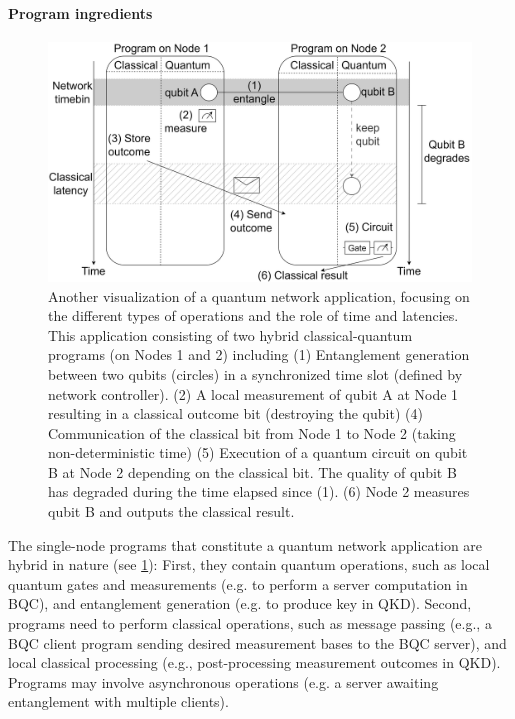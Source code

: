 \paragraph{Program ingredients}

\begin{figure}%
    \centering
    \includegraphics[scale=0.35]{figures/qoala/program_illustration.png}
    \caption{Another visualization of a quantum network application, focusing on the different types of operations and the role of time and latencies.
    This application consisting of two hybrid classical-quantum programs (on Nodes 1 and 2) including
        (1) Entanglement generation between two qubits (circles) in a synchronized time slot (defined by  network controller).
        (2) A local measurement of qubit A at Node 1 resulting in a classical outcome bit (destroying the qubit)
        (4) Communication of the classical bit from Node 1 to Node 2 (taking non-deterministic time)
        (5) Execution of a quantum circuit on qubit B at Node 2 depending on the classical bit. The quality of qubit B has degraded during the time elapsed since (1). 
        (6) Node 2 measures qubit B and outputs the classical result.
    }
    \label{background:fig:program_illustration}
\end{figure}

The single-node programs that constitute a quantum network application are hybrid in nature (see \cref{background:fig:program_illustration}):
First, they contain quantum operations, such as local quantum gates and measurements (e.g. to perform a server computation in BQC), and entanglement generation (e.g. to produce key in QKD).
Second, programs need to perform classical operations, such as message passing (e.g., a BQC client program sending desired measurement bases to the BQC server), and local classical processing (e.g., post-processing measurement outcomes in QKD).
Programs may involve asynchronous operations (e.g. a server awaiting entanglement with multiple clients).


